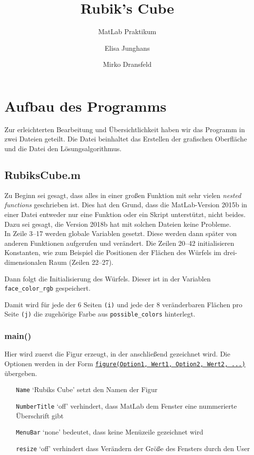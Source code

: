 \documentclass[a4paper,12pt]{scrreprt}
\title{Rubik's Cube}
\subtitle{MatLab Praktikum}
\author{Elisa Junghans\and Mirko Dransfeld}
\date{}
\newcommand{\codeimport}[4][]{
  
}
\newcommand{\codeinline}[1]{
  \lstinline!#1!
}
\newcommand{\chap}[2]{
  \chapter{#1}\label{#2}
}
\renewcommand{\sec}[2]{
  \section{#1}\label{#2}
}
\newcommand{\subsec}[2]{
  \subsection{#1}\label{#2}
}
\begin{document}
  \maketitle

  \chap{Aufbau des Programms}{aufbau}
    Zur erleichterten Bearbeitung und Übersichtlichkeit haben wir das Programm in zwei Dateien geteilt. Die Datei \textbf{} beinhaltet das Erstellen der grafischen Oberfläche und die Datei \textbf{} den Lösungsalgorithmus.

    \sec{RubiksCube.m}{RCube}
      Zu Beginn sei gesagt, dass alles in einer großen Funktion mit sehr vielen \emph{nested functions} geschrieben ist. Dies hat den Grund, dass die MatLab-Version 2015b in einer Datei entweder nur eine Funktion oder ein Skript unterstützt, nicht beides. Dazu sei gesagt, die Version 2018b hat mit solchen Dateien keine Probleme.\\

      In Zeile 3--17 werden globale Variablen gesetzt. Diese werden dann später von anderen Funktionen aufgerufen und verändert. Die Zeilen 20--42 initialisieren Konstanten, wie zum Beispiel die Positionen der Flächen des Würfels im drei-dimensionalen Raum (Zeilen 22--27).

      Dann folgt die Initialisierung des Würfels. Dieser ist in der Variablen \codeinline{face_color_rgb} gespeichert.
      \codeimport{44}{49}{RubiksCube}
      Damit wird für jede der 6 Seiten \codeinline{(i)} und jede der 8 veränderbaren Flächen pro Seite \codeinline{(j)} die zugehörige Farbe aus \codeinline{possible_colors} hinterlegt.

      \subsec{main()}{main}
        Hier wird zuerst die Figur erzeugt, in der anschließend gezeichnet wird. Die Optionen werden in der Form \hyperref[figure]{\codeinline{figure(Option1, Wert1, Option2, Wert2, ...)}} übergeben.
        \codeimport{53}{53}{RubiksCube}
        \begin{itemize}
          \item[\texttt{Name}] `Rubiks Cube' setzt den Namen der Figur
          \item[\texttt{NumberTitle}] `off' verhindert, dass MatLab dem Fenster eine nummerierte Überschrift gibt
          \item[\texttt{MenuBar}] `none' bedeutet, dass keine Menüzeile gezeichnet wird
          \item[\texttt{resize}] `off' verhindert dass Verändern der Größe des Fensters durch den User
        \end{itemize}
\end{document}
